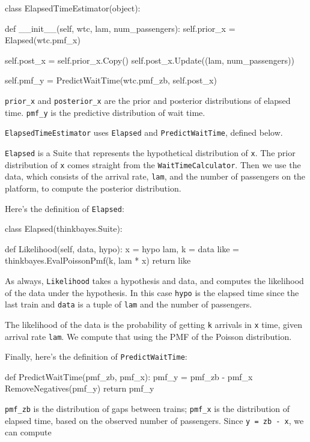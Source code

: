 \documentclass[12pt]{book}
\theoremstyle{exercise}
\newcommand{\py}[1]{{\tt #1}}%
\begin{document}
\begin{code}
class ElapsedTimeEstimator(object):

    def __init__(self, wtc, lam, num_passengers):
        self.prior_x = Elapsed(wtc.pmf_x)

        self.post_x = self.prior_x.Copy()
        self.post_x.Update((lam, num_passengers))

        self.pmf_y = PredictWaitTime(wtc.pmf_zb, self.post_x)
\end{code}

\verb"prior_x" and \verb"posterior_x" are the prior and
posterior distributions of elapsed time.  \verb"pmf_y" is
the predictive distribution of wait time.

\py{ElapsedTimeEstimator} uses \py{Elapsed} and \py{PredictWaitTime},
defined below.

\py{Elapsed} is a Suite that represents the hypothetical
distribution of \py{x}.  The prior distribution of \py{x}
comes straight from the \py{WaitTimeCalculator}.  Then we
use the data, which consists of the arrival rate, \py{lam},
and the number of passengers on the platform, to compute
the posterior distribution.

Here's the definition of \py{Elapsed}:

\begin{code}
class Elapsed(thinkbayes.Suite):

    def Likelihood(self, data, hypo):
        x = hypo
        lam, k = data
        like = thinkbayes.EvalPoissonPmf(k, lam * x)
        return like
\end{code}

As always, \py{Likelihood} takes a hypothesis and data, and
computes the likelihood of the data under the hypothesis.
In this case \py{hypo} is the elapsed time since the last train
and \py{data} is a tuple of \py{lam} and the number of
passengers.

The likelihood of the data is the probability of getting
\py{k} arrivals in \py{x} time, given arrival rate
\py{lam}.  We compute that using the PMF of the Poisson
distribution.

Finally, here's the definition of \py{PredictWaitTime}:

\begin{code}
def PredictWaitTime(pmf_zb, pmf_x):
    pmf_y = pmf_zb - pmf_x
    RemoveNegatives(pmf_y)
    return pmf_y
\end{code}

\verb"pmf_zb" is the distribution of gaps between trains;
\verb"pmf_x" is the distribution of elapsed time, based on
the observed number of passengers.  Since \py{y = zb - x},
we can compute
\end{document}
